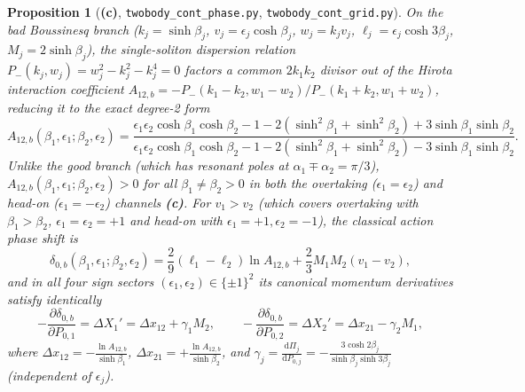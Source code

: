 \documentclass[11pt,a4paper]{article}
\newcommand{\Lc}{\textbf{(c)}}
\newcommand{\script}[1]{\texttt{#1}}
\newcommand{\dd}{\mathrm{d}}
\newtheorem{proposition}{Proposition}[section]
\begin{document}
\begin{proposition}[\Lc, \script{twobody\_cont\_phase.py}, \script{twobody\_cont\_grid.py}]\label{prop:bad_classical}
On the bad Boussinesq branch ($k_j=\sinh\beta_j$, $v_j=\epsilon_j\cosh\beta_j$, $w_j=k_j v_j$, $\ell_j=\epsilon_j\cosh 3\beta_j$, $M_j=2\sinh\beta_j$), the single-soliton dispersion relation $P_-(k_j,w_j)=w_j^2-k_j^2-k_j^4=0$ factors a common $2k_1 k_2$ divisor out of the Hirota interaction coefficient $A_{12,b}=-P_-(k_1-k_2,w_1-w_2)/P_-(k_1+k_2,w_1+w_2)$, reducing it to the exact degree-2 form
\begin{equation}\label{eq:A12_bad_factored}
A_{12,b}(\beta_1,\epsilon_1;\beta_2,\epsilon_2)
=\frac{\epsilon_1\epsilon_2\cosh\beta_1\cosh\beta_2-1-2(\sinh^2\beta_1+\sinh^2\beta_2)+3\sinh\beta_1\sinh\beta_2}{\epsilon_1\epsilon_2\cosh\beta_1\cosh\beta_2-1-2(\sinh^2\beta_1+\sinh^2\beta_2)-3\sinh\beta_1\sinh\beta_2}.
\end{equation}
Unlike the good branch (which has resonant poles at $\alpha_1\mp\alpha_2=\pi/3$), $A_{12,b}(\beta_1,\epsilon_1;\beta_2,\epsilon_2)>0$ for all $\beta_1\neq\beta_2>0$ in both the overtaking ($\epsilon_1=\epsilon_2$) and head-on ($\epsilon_1=-\epsilon_2$) channels \Lc. For $v_1>v_2$ (which covers overtaking with $\beta_1>\beta_2$, $\epsilon_1=\epsilon_2=+1$ and head-on with $\epsilon_1=+1,\epsilon_2=-1$), the classical action phase shift is
\begin{equation}\label{eq:delta0_bad}
\delta_{0,b}(\beta_1,\epsilon_1;\beta_2,\epsilon_2)
=\frac29(\ell_1-\ell_2)\ln A_{12,b}+\frac23 M_1 M_2(v_1-v_2),
\end{equation}
and in all four sign sectors $(\epsilon_1,\epsilon_2)\in\{\pm 1\}^2$ its canonical momentum derivatives satisfy identically
\begin{equation}\label{eq:d_delta0_dP}
-\frac{\partial\delta_{0,b}}{\partial P_{0,1}}=\Delta X_1'=\Delta x_{12}+\gamma_1 M_2,\qquad
-\frac{\partial\delta_{0,b}}{\partial P_{0,2}}=\Delta X_2'=\Delta x_{21}-\gamma_2 M_1,
\end{equation}
where $\Delta x_{12}=-\frac{\ln A_{12,b}}{\sinh\beta_1}$, $\Delta x_{21}=+\frac{\ln A_{12,b}}{\sinh\beta_2}$, and $\gamma_j=\frac{\dd\Pi_j}{\dd P_{0,j}}=-\frac{3\cosh 2\beta_j}{\sinh\beta_j\sinh 3\beta_j}$ (independent of $\epsilon_j$).
\end{proposition}
\end{document}
